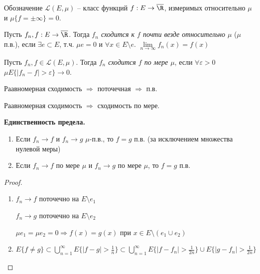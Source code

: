 Обозначение $\mathcal{L}(E, \mu)$ – класс функций $f:E\rightarrow \overline{\R}$, измеримых относительно
$\mu$ и $\mu \{f=\pm \infty\}=0$.

\begin{definition}
    Пусть $f_n, f:E\rightarrow \overline{\R}$. Тогда \textit{$f_n$ сходится к $f$ почти везде относительно $\mu$} ($\mu$ п.в.),
    если $\exists e\subset E$, т.ч. $\mu e=0$ и $\forall x\in E\setminus e$. $\lim\limits_{n\rightarrow \infty} f_n(x)=f(x)$
\end{definition}

\begin{definition}
    Пусть $f_n, f\in \mathcal{L}(E, \mu)$. Тогда \textit{$f_n$ сходится $f$ по мере $\mu$}, если 
    $\forall \varepsilon > 0$ $\mu E\{|f_n - f|> \varepsilon\}\rightarrow 0$.
\end{definition}

\begin{remark}
    Раавномерная сходимость $\Rightarrow$ поточечная $\Rightarrow$ п.в.

    Раавномерная сходимость $\Rightarrow$ сходимость по мере.
\end{remark}

\begin{statement}
    \textbf{Единственность предела.}

    \begin{enumerate}
        \item Если $f_n\rightarrow f$ и $f_n\rightarrow g$ $\mu$-п.в., то $f=g$ п.в.
        (за исключением множества нулевой меры)

        \item Если $f_n\rightarrow f$ по мере $\mu$ и $f_n\rightarrow g$ по мере $\mu$, то $f=g$ п.в.
    \end{enumerate}
\end{statement}

\begin{proof}~
    \begin{enumerate}
        \item $f_n\rightarrow f$ поточечно на $E\setminus e_1$
        
        $f_n\rightarrow g$ поточечно на $E\setminus e_2$

        $\mu e_1=\mu e_2=0\Rightarrow f(x)=g(x)$ при $x\in E \setminus (e_1 \cup e_2)$

        \item $E\{f\not = g\}\subset \bigcup\limits_{n=1}^\infty E\{|f - g|> \frac{1}{n}\}\subset
        \bigcup\limits_{n=1}^\infty E\{|f - f_n|> \frac{1}{2n}\}\cup E\{|g - f_n|> \frac{1}{2n}\}$
    \end{enumerate}
\end{proof}

